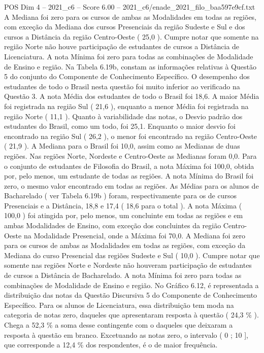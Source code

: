 \begin{textsample}{POS Dim 4 – 2021\_c6 – Score 6.00 – 2021\_c6/enade\_2021\_filo\_baa597e9cf.txt}
A Mediana foi zero para os cursos de ambas as Modalidades em todas as regiões, com exceção da Mediana dos cursos Presenciais da região Sudeste e Sul e dos cursos a Distância da região Centro-Oeste ( 25,0 ).
Cumpre notar que somente na região Norte não houve participação de estudantes de cursos a Distância de Licenciatura.
A nota Mínima foi zero para todas as combinações de Modalidade de Ensino e região.
Na Tabela 6.19b, constam as informações relativas à Questão 5 do conjunto do Componente de Conhecimento Específico.
O desempenho dos estudantes de todo o Brasil nesta questão foi muito inferior ao verificado na Questão 3.
A nota Média dos estudantes de todo o Brasil foi 18,6.
A maior Média foi registrada na região Sul ( 21,6 ), enquanto a menor Média foi registrada na região Norte ( 11,1 ).
Quanto à variabilidade das notas, o Desvio padrão dos estudantes do Brasil, como um todo, foi 25,1.
Enquanto o maior desvio foi encontrado na região Sul ( 26,2 ), o menor foi encontrado na região Centro-Oeste ( 21,9 ).
A Mediana para o Brasil foi 10,0, assim como as Medianas de duas regiões.
Nas regiões Norte, Nordeste e Centro-Oeste as Medianas foram 0,0.
Para o conjunto de estudantes de Filosofia do Brasil, a nota Máxima foi 100,0, obtida por, pelo menos, um estudante de todas as regiões.
A nota Mínima do Brasil foi zero, o mesmo valor encontrado em todas as regiões.
As Médias para os alunos de Bacharelado ( ver Tabela 6.19b ) foram, respectivamente para os de cursos Presenciais e a Distância, 18,8 e 17,4 ( 18,6 para o total ).
A nota Máxima ( 100,0 ) foi atingida por, pelo menos, um concluinte em todas as regiões e em ambas Modalidades de Ensino, com exceção dos concluintes da região Centro-Oeste na Modalidade Presencial, onde a Máxima foi 70,0.
A Mediana foi zero para os cursos de ambas as Modalidades em todas as regiões, com exceção da Mediana do curso Presencial das regiões Sudeste e Sul ( 10,0 ).
Cumpre notar que somente nas regiões Norte e Nordeste não houveram participação de estudantes de cursos a Distância de Bacharelado.
A nota Mínima foi zero para todas as combinações de Modalidade de Ensino e região.
No Gráfico 6.12, é representada a distribuição das notas da Questão Discursiva 5 do Componente de Conhecimento Específico.
Para os alunos de Licenciatura, essa distribuição tem moda na categoria de notas zero, daqueles que apresentaram resposta à questão ( 24,3 \% ).
Chega a 52,3 \% a soma desse contingente com o daqueles que deixaram a resposta à questão em branco.
Excetuando as notas zero, o intervalo ( 0 ; 10 ], que corresponde a 12,4 \% dos respondentes, é o de maior frequência.

\end{textsample}

